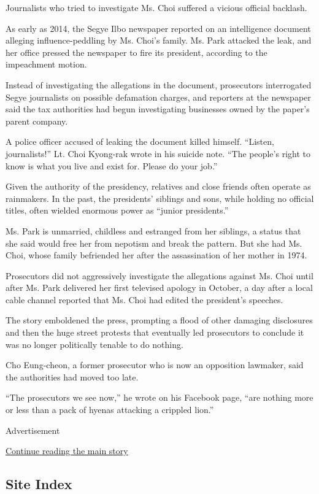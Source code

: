 Journalists who tried to investigate Ms. Choi suffered a vicious
official backlash.

As early as 2014, the Segye Ilbo newspaper reported on an intelligence
document alleging influence-peddling by Ms. Choi's family. Ms. Park
attacked the leak, and her office pressed the newspaper to fire its
president, according to the impeachment motion.

Instead of investigating the allegations in the document, prosecutors
interrogated Segye journalists on possible defamation charges, and
reporters at the newspaper said the tax authorities had begun
investigating businesses owned by the paper's parent company.

A police officer accused of leaking the document killed himself.
``Listen, journalists!'' Lt. Choi Kyong-rak wrote in his suicide note.
``The people's right to know is what you live and exist for. Please do
your job.''

Given the authority of the presidency, relatives and close friends often
operate as rainmakers. In the past, the presidents' siblings and sons,
while holding no official titles, often wielded enormous power as
``junior presidents.''

Ms. Park is unmarried, childless and estranged from her siblings, a
status that she said would free her from nepotism and break the pattern.
But she had Ms. Choi, whose family befriended her after the
assassination of her mother in 1974.

Prosecutors did not aggressively investigate the allegations against Ms.
Choi until after Ms. Park delivered her first televised apology in
October, a day after a local cable channel reported that Ms. Choi had
edited the president's speeches.

The story emboldened the press, prompting a flood of other damaging
disclosures and then the huge street protests that eventually led
prosecutors to conclude it was no longer politically tenable to do
nothing.

Cho Eung-cheon, a former prosecutor who is now an opposition lawmaker,
said the authorities had moved too late.

``The prosecutors we see now,'' he wrote on his Facebook page, ``are
nothing more or less than a pack of hyenas attacking a crippled lion.''

Advertisement

\protect\hyperlink{after-bottom}{Continue reading the main story}

\hypertarget{site-index}{%
\subsection{Site Index}\label{site-index}}

